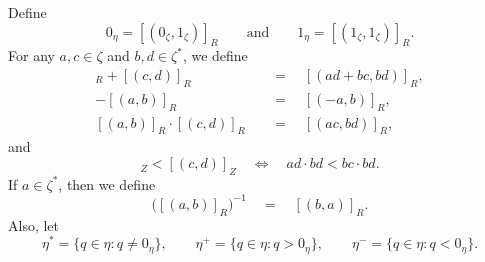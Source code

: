 \documentclass[11pt]{article}
\begin{document}
\begin{definition}
  Define
  \begin{equation*}
    0_\eta = [(0_\zeta, 1_\zeta)]_R \qquad \text{and} \qquad 1_\eta = [(1_\zeta, 1_\zeta)]_R.
  \end{equation*}
  For any $a, c \in \zeta$ and $b, d \in \zeta^*$, we define
  \begin{align*}
    [(a, b)]_R + [(c, d)]_R \quad &= \quad [(ad + bc, bd)]_R, \\
    -[(a, b)]_R \quad &= \quad [(-a, b)]_R, \\
    [(a, b)]_R \cdot [(c, d)]_R \quad &= \quad [(ac, bd)]_R,
  \end{align*}
  and
  \begin{equation*}
    [(a, b)]_Z < [(c, d)]_Z \quad \iff \quad ad \cdot bd < bc \cdot bd.
  \end{equation*}
  If $a \in \zeta^*$, then we define
  \begin{equation*}
    \bigl([(a, b)]_R\bigr)^{-1} \quad = \quad [(b, a)]_R.
  \end{equation*}
  Also, let
  \begin{equation*}
    \eta^* = \{q \in \eta: q \neq 0_\eta\}, \qquad
    \eta^+ = \{q \in \eta: q > 0_\eta\}, \qquad
    \eta^- = \{q \in \eta: q < 0_\eta\}.
  \end{equation*}
\end{definition}
\end{document}
